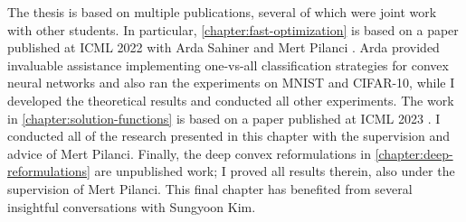 
The thesis is based on multiple publications, several of which were joint work
with other students.
In particular, \cref{chapter:fast-optimization} is based on a paper published
at ICML 2022 with Arda Sahiner and Mert Pilanci \citep{mishkin2022convex}.
Arda provided invaluable assistance implementing one-vs-all classification
strategies for convex neural networks and also ran the experiments on MNIST
and CIFAR-10, while I developed the theoretical results and conducted all other
experiments.
The work in \cref{chapter:solution-functions} is based on a paper
published at ICML 2023 \citep{mishkin2023optimal}.
I conducted all of the research presented in this chapter with the supervision
and advice of Mert Pilanci.
Finally, the deep convex reformulations in \cref{chapter:deep-reformulations}
are unpublished work;
I proved all results therein, also under the supervision of Mert Pilanci.
This final chapter has benefited from several insightful conversations with
Sungyoon Kim.
